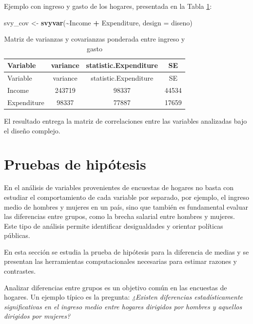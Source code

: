 \documentclass[
  spanish,
  12pt,
]{book}
\newenvironment{Shaded}{\begin{snugshade}}{\end{snugshade}}
\newcommand{\AttributeTok}[1]{\textcolor[rgb]{0.13,0.29,0.53}{#1}}
\newcommand{\FunctionTok}[1]{\textcolor[rgb]{0.13,0.29,0.53}{\textbf{#1}}}
\newcommand{\NormalTok}[1]{#1}
\newcommand{\OtherTok}[1]{\textcolor[rgb]{0.56,0.35,0.01}{#1}}
\newcommand{\SpecialCharTok}[1]{\textcolor[rgb]{0.81,0.36,0.00}{\textbf{#1}}}
\begin{document}
Ejemplo con ingreso y gasto de los hogares, presentada en la Tabla \ref{tab:tab-covarianza}:

\begin{Shaded}
\begin{Highlighting}[]
\NormalTok{svy\_cov }\OtherTok{\textless{}{-}} \FunctionTok{svyvar}\NormalTok{(}\SpecialCharTok{\textasciitilde{}}\NormalTok{Income }\SpecialCharTok{+}\NormalTok{ Expenditure, }\AttributeTok{design =}\NormalTok{ diseno)}
\end{Highlighting}
\end{Shaded}

\begin{longtable}[]{@{}lccc@{}}
\caption{\label{tab:tab-covarianza}Matriz de varianzas y covarianzas ponderada entre ingreso y gasto}\tabularnewline
\toprule\noalign{}
Variable & variance & statistic.Expenditure & SE \\
\midrule\noalign{}
\endfirsthead
\toprule\noalign{}
Variable & variance & statistic.Expenditure & SE \\
\midrule\noalign{}
\endhead
\bottomrule\noalign{}
\endlastfoot
Income & 243719 & 98337 & 44534 \\
Expenditure & 98337 & 77887 & 17659 \\
\end{longtable}

El resultado entrega la matriz de correlaciones entre las variables analizadas bajo el diseño complejo.

\section{Pruebas de hipótesis}\label{pruebas-de-hipuxf3tesis}

En el análisis de variables provenientes de encuestas de hogares no basta con estudiar el comportamiento de cada variable por separado, por ejemplo, el ingreso medio de hombres y mujeres en un país, sino que también es fundamental evaluar las diferencias entre grupos, como la brecha salarial entre hombres y mujeres. Este tipo de análisis permite identificar desigualdades y orientar políticas públicas.

En esta sección se estudia la prueba de hipótesis para la diferencia de medias y se presentan las herramientas computacionales necesarias para estimar razones y contrastes.

Analizar diferencias entre grupos es un objetivo común en las encuestas de hogares. Un ejemplo típico es la pregunta: \emph{¿Existen diferencias estadísticamente significativas en el ingreso medio entre hogares dirigidos por hombres y aquellos dirigidos por mujeres?}
\end{document}
